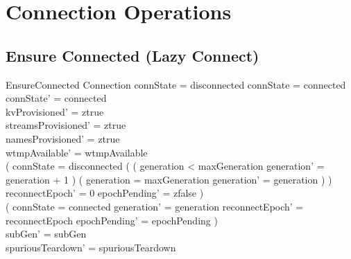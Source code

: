 \documentclass[a4paper,10pt,fleqn]{article}
\begin{document}
\section{Connection Operations}

\subsection{Ensure Connected (Lazy Connect)}

\begin{schema}{EnsureConnected}
  \Delta Connection
  \where
  connState = disconnected \lor connState = connected \\
  connState' = connected \\
  kvProvisioned' = ztrue \\
  streamsProvisioned' = ztrue \\
  namesProvisioned' = ztrue \\
  wtmpAvailable' = wtmpAvailable \\
  ( connState = disconnected \land
    ( ( generation < maxGeneration \land
        generation' = generation + 1 ) \lor
      ( generation = maxGeneration \land
        generation' = generation ) ) \land
    reconnectEpoch' = 0 \land epochPending' = zfalse ) \lor \\
  ( connState = connected \land generation' = generation \land
    reconnectEpoch' = reconnectEpoch \land epochPending' = epochPending ) \\
  subGen' = subGen \\
  spuriousTeardown' = spuriousTeardown
\end{schema}
\end{document}

